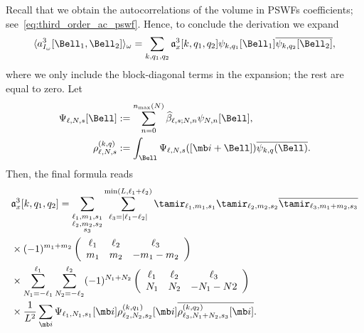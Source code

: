 \documentclass[9pt,twocolumn,twoside,lineno]{pnas-new}
\begin{document}
Recall that we obtain the autocorrelations of the volume in PSWFs coefficients; see~\eqref{eq:third_order_ac_pswf}. Hence, to conclude the derivation we expand
\[ \langle a^3_{I_{\omega}}[\Bell_1, \Bell_2]\rangle_{\omega}= \sum_{k,q_1,q_2}\mathfrak{a}_x^3[k,q_1,q_2]\psi_{k,q_1}[\Bell_1]\overline{\psi_{k,q_2}[\Bell_2]},\]
where we only include the block-diagonal terms in the expansion; the rest are equal to zero. Let
\begin{align*}
\Psi_{\ell,N,s}[\Bell] &:= \sum_{n=0}^{n_{\text{max}}(N)}\widehat\beta_{\ell,s;N,n}\psi_{N,n}[\Bell],\\ 
\rho_{\ell,N,s}^{(k,q)}&:=\int_{\Bell}\Psi_{\ell,N,s}([\mb i+\Bell])\overline{\psi_{k,q}(\Bell)}.
\end{align*}
Then, 
the final formula reads
\begin{align} \label{eq:ac_3_prolates}
 &\mathfrak{a}_x^3[k,q_1,q_2] = \sum_{\substack{\ell_1,m_1,s_1\nonumber \\ \ell_2,m_2,s_2\\s_3}}\sum_{\ell_3=|\ell_1-\ell_2|}^{\min(L,\ell_1+\ell_2)}\tamir_{\ell_1,m_1,s_1}\tamir_{\ell_2,m_2,s_2}\overline{\tamir_{\ell_3,m_1+m_2,s_3}}\\
&\times (-1)^{m_1+m_2}\left(\begin{array}{ccc}\ell_1 & \ell_2  & \ell_3\\ m_1 & m_2 & -m_1-m_2\end{array}\right)\\
&\times \sum_{N_1=-\ell_1}^{\ell_1}\sum_{N_2=-\ell_2}^{\ell_2}(-1)^{N_1+N_2}\left(\begin{array}{ccc}\ell_1 & \ell_2  & \ell_3\nonumber\\ N_1 & N_2 & -N_1-N2\end{array}\right)\nonumber\\&\times\frac{1}{L^2}\sum_{\mb i}\Psi_{\ell_1,N_1,s_1}[\mb i]\rho_{\ell_2,N_2,s_2}^{(k,q_1)}[\mb i]\overline{\rho_{\ell_3,N_1+N_2,s_3}^{(k,q_2)}[\mb i]}. \nonumber
\end{align}
%
\end{document}
